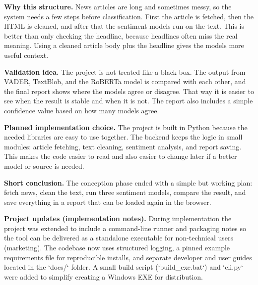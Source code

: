 \documentclass[11pt,a4paper]{article}
\begin{document}
\textbf{Why this structure.}
News articles are long and sometimes messy, so the system needs a few steps before classification. First the article is fetched, then the HTML is cleaned, and after that the sentiment models run on the text. This is better than only checking the headline, because headlines often miss the real meaning. Using a cleaned article body plus the headline gives the models more useful context.

\textbf{Validation idea.}
The project is not treated like a black box. The output from VADER, TextBlob, and the RoBERTa model is compared with each other, and the final report shows where the models agree or disagree. That way it is easier to see when the result is stable and when it is not. The report also includes a simple confidence value based on how many models agree.

\textbf{Planned implementation choice.}
The project is built in Python because the needed libraries are easy to use together. The backend keeps the logic in small modules: article fetching, text cleaning, sentiment analysis, and report saving. This makes the code easier to read and also easier to change later if a better model or source is needed.

\textbf{Short conclusion.}
The conception phase ended with a simple but working plan: fetch news, clean the text, run three sentiment models, compare the result, and save everything in a report that can be loaded again in the browser.

\vspace{2mm}
\textbf{Project updates (implementation notes).}
During implementation the project was extended to include a command-line runner and packaging notes so the tool can be delivered as a standalone executable for non-technical users (marketing). The codebase now uses structured logging, a pinned example requirements file for reproducible installs, and separate developer and user guides located in the `docs/` folder. A small build script (`build_exe.bat`) and `cli.py` were added to simplify creating a Windows EXE for distribution.
\end{document}
